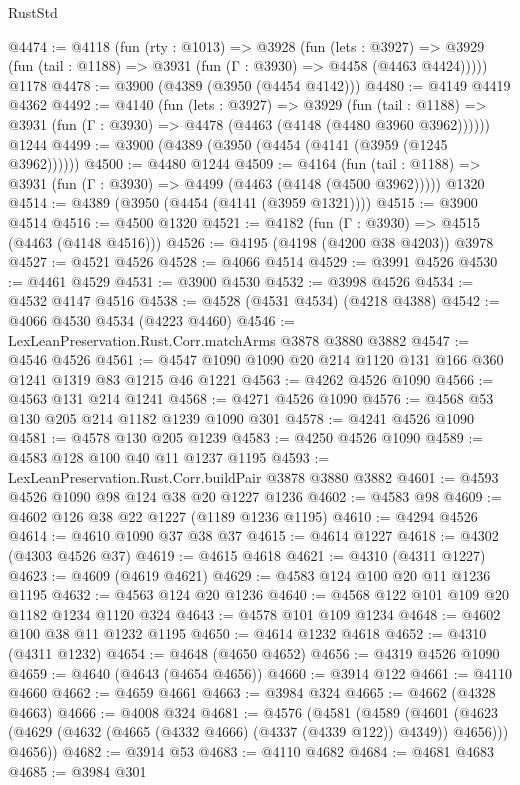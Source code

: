 \begin{lexlean}{RustStd}
\begin{coremodule}
@4474 := @4118
    (fun (rty : @1013) =>
    @3928
      (fun (lets : @3927) =>
      @3929 (fun (tail : @1188) => @3931 (fun (Γ : @3930) => @4458 (@4463 @4424)))))
    @1178
@4478 := @3900 (@4389 (@3950 (@4454 @4142)))
@4480 := @4149 @4419 @4362
@4492 := @4140
    (fun (lets : @3927) =>
    @3929
      (fun (tail : @1188) => @3931 (fun (Γ : @3930) => @4478 (@4463 (@4148 (@4480 @3960 @3962))))))
    @1244
@4499 := @3900 (@4389 (@3950 (@4454 (@4141 (@3959 (@1245 @3962))))))
@4500 := @4480 @1244
@4509 := @4164
    (fun (tail : @1188) => @3931 (fun (Γ : @3930) => @4499 (@4463 (@4148 (@4500 @3962)))))
    @1320
@4514 := @4389 (@3950 (@4454 (@4141 (@3959 @1321))))
@4515 := @3900 @4514
@4516 := @4500 @1320
@4521 := @4182 (fun (Γ : @3930) => @4515 (@4463 (@4148 @4516)))
@4526 := @4195 (@4198 (@4200 @38 @4203)) @3978
@4527 := @4521 @4526
@4528 := @4066 @4514
@4529 := @3991 @4526
@4530 := @4461 @4529
@4531 := @3900 @4530
@4532 := @3998 @4526
@4534 := @4532 @4147 @4516
@4538 := @4528 (@4531 @4534) (@4218 @4388)
@4542 := @4066 @4530 @4534 (@4223 @4460)
@4546 := LexLeanPreservation.Rust.Corr.matchArms @3878 @3880 @3882
@4547 := @4546 @4526
@4561 := @4547 @1090 @1090 @20 @214 @1120 @131 @166 @360 @1241 @1319 @83 @1215 @46 @1221
@4563 := @4262 @4526 @1090
@4566 := @4563 @131 @214 @1241
@4568 := @4271 @4526 @1090
@4576 := @4568 @53 @130 @205 @214 @1182 @1239 @1090 @301
@4578 := @4241 @4526 @1090
@4581 := @4578 @130 @205 @1239
@4583 := @4250 @4526 @1090
@4589 := @4583 @128 @100 @40 @11 @1237 @1195
@4593 := LexLeanPreservation.Rust.Corr.buildPair @3878 @3880 @3882
@4601 := @4593 @4526 @1090 @98 @124 @38 @20 @1227 @1236
@4602 := @4583 @98
@4609 := @4602 @126 @38 @22 @1227 (@1189 @1236 @1195)
@4610 := @4294 @4526
@4614 := @4610 @1090 @37 @38 @37
@4615 := @4614 @1227
@4618 := @4302 (@4303 @4526 @37)
@4619 := @4615 @4618
@4621 := @4310 (@4311 @1227)
@4623 := @4609 (@4619 @4621)
@4629 := @4583 @124 @100 @20 @11 @1236 @1195
@4632 := @4563 @124 @20 @1236
@4640 := @4568 @122 @101 @109 @20 @1182 @1234 @1120 @324
@4643 := @4578 @101 @109 @1234
@4648 := @4602 @100 @38 @11 @1232 @1195
@4650 := @4614 @1232 @4618
@4652 := @4310 (@4311 @1232)
@4654 := @4648 (@4650 @4652)
@4656 := @4319 @4526 @1090
@4659 := @4640 (@4643 (@4654 @4656))
@4660 := @3914 @122
@4661 := @4110 @4660
@4662 := @4659 @4661
@4663 := @3984 @324
@4665 := @4662 (@4328 @4663)
@4666 := @4008 @324
@4681 := @4576
    (@4581
      (@4589
        (@4601 (@4623 (@4629 (@4632 (@4665 (@4332 @4666) (@4337 (@4339 @122)) @4349)) @4656)))
        @4656))
@4682 := @3914 @53
@4683 := @4110 @4682
@4684 := @4681 @4683
@4685 := @3984 @301

\end{coremodule}
\end{lexlean}
